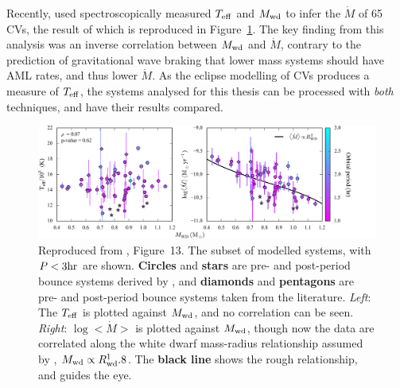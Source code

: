 Recently, \citet{Pala2021} used spectroscopically measured $T_{\rm eff}$ and $M_{\rm wd}$ to infer the $\dot M$ of 65 CVs, the result of which is reproduced in Figure~\ref{fig:modelling:pala2022 fig13}.
The key finding from this analysis was an inverse correlation between $M_{\rm wd}$ and $\dot M$, contrary to the prediction of gravitational wave braking that lower mass systems should have AML rates, and thus lower $\dot M$.
As the eclipse modelling of CVs produces a measure of $T_{\rm eff}$, the systems analysed for this thesis can be processed with {\it both} techniques, and have their results compared.
\begin{figure}
    \centering
    \includegraphics[width=\textwidth]{figures/modelling/pala_2022_fig13.png}
    \caption{Reproduced from \citet{Pala2021}, Figure~13. The subset of modelled systems, with $P < 3{\rm hr}$ are shown. {\bf Circles} and {\bf stars} are pre- and post-period bounce systems derived by \citet{Pala2021}, and {\bf diamonds} and {\bf pentagons} are pre- and post-period bounce systems taken from the literature. {\it Left}: The $T_{\rm eff}$ is plotted against $M_{\rm wd}$, and no correlation can be seen. {\it Right}: $\log<\dot M>$ is plotted against $M_{\rm wd}$, though now the data are correlated along the white dwarf mass-radius relationship assumed by \citet{Pala2021}, $M_{\rm wd} \propto R_{\rm wd}^1.8$. The {\bf black line} shows the rough relationship, and guides the eye.}
    \label{fig:modelling:pala2022 fig13}
\end{figure}
